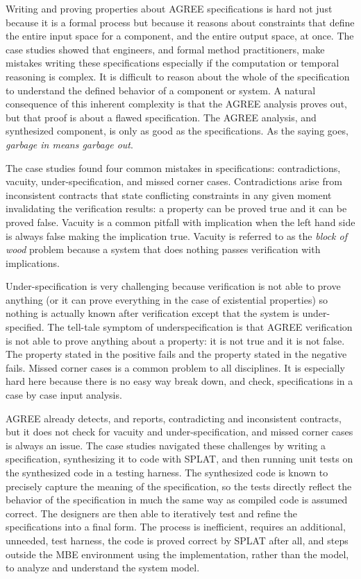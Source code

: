 Writing and proving properties about AGREE specifications is hard not just because it is a formal process but  because it reasons about constraints that define the entire input space for a component, and the entire output space, at once.
The case studies showed that engineers, and formal method practitioners, make mistakes writing these specifications especially if the computation or temporal reasoning is complex.
It is difficult to reason about the whole of the specification to understand the defined behavior of a component or system.
A natural consequence of this inherent complexity is that the AGREE analysis proves out, but that proof is about a flawed specification.
The AGREE analysis, and synthesized component, is only as good as the specifications.
As the saying goes, \emph{garbage in means garbage out}.

The case studies found four common mistakes in specifications: contradictions, vacuity, under-specification, and missed corner cases.
Contradictions arise from inconsistent contracts that state conflicting constraints in any given moment invalidating the verification results: a property can be proved true and it can be proved false.
Vacuity is a common pitfall with implication when the left hand side is always false making the implication true. 
Vacuity is referred to as the \emph{block of wood} problem because a system that does nothing passes verification with implications.

Under-specification is very challenging because verification is not able to prove anything (or it can prove everything in the case of existential properties) so nothing is actually known after verification except that the system is under-specified. 
The tell-tale symptom of underspecification is that AGREE verification is not able to prove anything about a property: it is not true and it is not false.
The property stated in the positive fails and the property stated in the negative fails.
Missed corner cases is a common problem to all disciplines.
It is especially hard here because there is no easy way break down, and check, specifications in a case by case input analysis.

AGREE already detects, and reports, contradicting and inconsistent contracts, but it does not check for vacuity and under-specification, and missed corner cases is always an issue.
The case studies navigated these challenges by writing a specification, synthesizing it to code with SPLAT, and then running unit 
tests on the synthesized code in a testing harness.
The synthesized code is known to precisely capture the meaning of the specification, so the tests directly reflect the behavior of the specification in much the same way as compiled code is assumed correct.
The designers are then able to iteratively test and refine the specifications into a final form.
The process is inefficient, requires an additional, unneeded, test harness, the code is proved correct by SPLAT after all, and steps outside the MBE environment using the implementation, rather than the model, to analyze and understand the system model.

